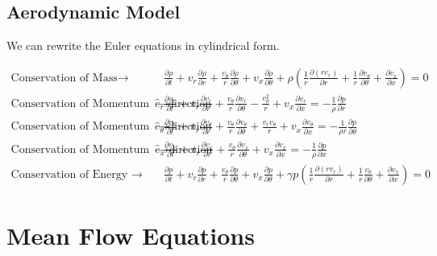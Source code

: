 \documentclass[12pt]{article}
\begin{document}
\subsection{Aerodynamic Model}
We can rewrite the Euler equations in cylindrical form.

\begin{align*}
\text{Conservation of Mass} \rightarrow& \frac{\partial \rho}{\partial t} + %
v_r \frac{\partial \rho}{\partial r} +
\frac{v_{\theta}   }{r}
\frac{\partial \rho}{\partial \theta} +
v_x \frac{\partial \rho}{\partial \theta} + 
\rho 
\left(
\frac{1}{r} \frac{\partial (rv_r)	}{\partial r} +
\frac{1}{r}	\frac{\partial v_{\theta}}{\partial \theta} +
\frac{\partial v_x}{\partial x}
\right) 
= 0 \\%
\text{Conservation of Momentum in the $\hat{e}_r$ direction} \rightarrow&\frac{\partial v_r}{\partial t} + 
v_r \frac{\partial v_r}{\partial r} +
\frac{v_{\theta}  }{r}
\frac{\partial v_r}{\partial \theta}- \frac{v_{\theta}^2}{r}+ 
v_x \frac{\partial v_r}{\partial x} 
= -\frac{1}{\rho} \frac{\partial p}{\partial r}\\  \text{Conservation of Momentum in the $\hat{e}_{\theta}$ direction} \rightarrow& 
\frac{\partial v_{\theta}}{\partial t} + 
v_r \frac{\partial v_{\theta}}{\partial r} +
\frac{v_{\theta}}{r}
\frac{\partial v_{\theta}}{\partial \theta} +
\frac{v_r v_{\theta}}{r}+ 
v_x \frac{\partial v_{\theta}}{\partial x} 
= -\frac{1}{\rho r} \frac{\partial p}{\partial \theta}\\ 
\text{Conservation of Momentum in the $\hat{e}_x$ direction} \rightarrow&
\frac{\partial v_{x}}{\partial t} + 
v_r 
\frac{\partial v_x}{\partial r} +
\frac{v_{\theta}}{r}
\frac{\partial v_x}{\partial \theta}+ 
v_x \frac{\partial v_x}{\partial x} 
= 
-\frac{1}{\rho } 
\frac{\partial p}{\partial x}\\  \text{Conservation of Energy } \rightarrow& 
\frac{\partial p }{\partial t} +
v_r 
\frac{\partial p}{\partial r} +
\frac{v_{\theta}}{r}
\frac{\partial p}{\partial \theta} +
v_x \frac{\partial p}{\partial \theta} + 
\gamma p 
\left(
\frac{1}{r}\frac{\partial (rv_r)}{\partial r} +
\frac{1}{r}\frac{v_{\theta}}{\partial \theta} +
\frac{\partial v_x}{\partial x}
\right) = 0
\end{align*}

\section{Mean Flow Equations}
\end{document}
